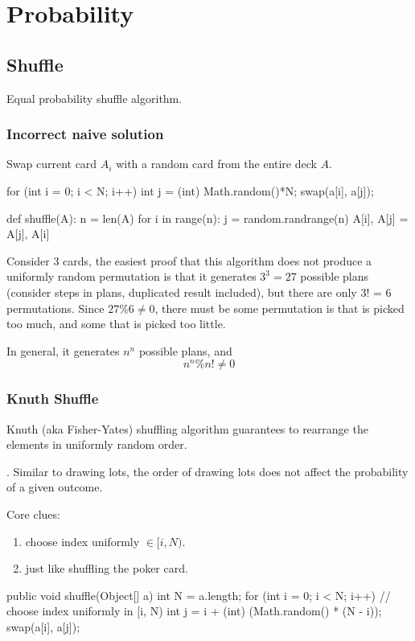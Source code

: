 \chapter{Probability}


\section{Shuffle}
Equal probability shuffle algorithm.

\subsection{Incorrect naive solution}
Swap current card $A_i$ with a random card from the entire deck $A$. 
\begin{java}
for (int i = 0; i < N; i++) {
   int j = (int) Math.random()*N;
   swap(a[i], a[j]);
}
\end{java}
\begin{python}
def shuffle(A):
  n = len(A)
  for i in range(n):
    j = random.randrange(n)
    A[i], A[j] = A[j], A[i]
\end{python}
Consider 3 cards, the easiest proof that this algorithm does not produce a uniformly random permutation is that it generates $3^3=27$ possible plans (consider steps in plans, duplicated result included), but there are only 3! = 6 permutations. Since $27\%6 \neq 0$, there must be some permutation is that is picked too much, and some that is picked too little. 

In general, it generates $n^n$ possible plans, and
$$
n^n \% n! \neq 0
$$ 
\subsection{Knuth Shuffle}
Knuth (aka Fisher-Yates) shuffling algorithm guarantees to rearrange the elements in uniformly random order. 

. Similar to drawing lots, the order of drawing lots does not affect the probability of a given outcome.

Core clues:
\begin{enumerate}
\item choose index uniformly $\in [i, N)$.
\item just like shuffling the poker card.
\end{enumerate}
\begin{java}
public void shuffle(Object[] a) {
    int N = a.length;
    for (int i = 0; i < N; i++) {
        // choose index uniformly in [i, N)
        int j = i + (int) (Math.random() * (N - i));
        swap(a[i], a[j]);
    }
}
\end{java}

